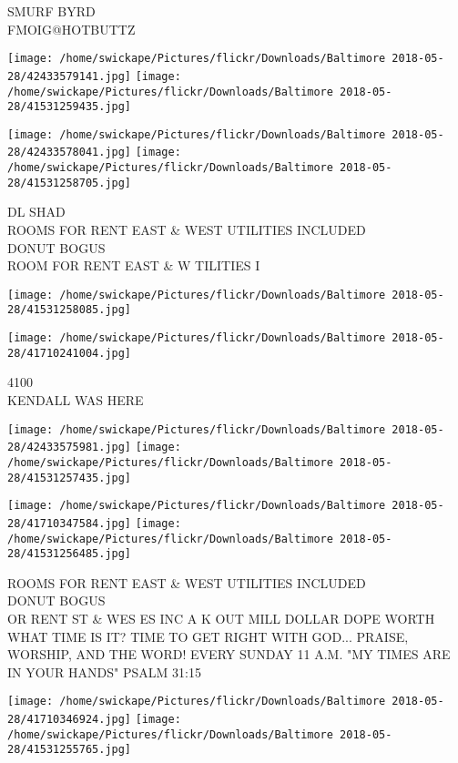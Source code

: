\documentclass[10pt,letterpaper]{article}
\begin{document}
SMURF BYRD\\
FMOIG@HOTBUTTZ
\pagebreak

\texttt{[image: /home/swickape/Pictures/flickr/Downloads/Baltimore 2018-05-28/42433579141.jpg]}
\texttt{[image: /home/swickape/Pictures/flickr/Downloads/Baltimore 2018-05-28/41531259435.jpg]}

\texttt{[image: /home/swickape/Pictures/flickr/Downloads/Baltimore 2018-05-28/42433578041.jpg]}
\texttt{[image: /home/swickape/Pictures/flickr/Downloads/Baltimore 2018-05-28/41531258705.jpg]}

DL SHAD\\
ROOMS FOR RENT EAST \& WEST UTILITIES INCLUDED\\
DONUT BOGUS\\
ROOM FOR RENT EAST \& W TILITIES I
\pagebreak

\texttt{[image: /home/swickape/Pictures/flickr/Downloads/Baltimore 2018-05-28/41531258085.jpg]}

\vspace{0.25in}
\texttt{[image: /home/swickape/Pictures/flickr/Downloads/Baltimore 2018-05-28/41710241004.jpg]}

4100\\
KENDALL WAS HERE
\pagebreak

\texttt{[image: /home/swickape/Pictures/flickr/Downloads/Baltimore 2018-05-28/42433575981.jpg]}
\texttt{[image: /home/swickape/Pictures/flickr/Downloads/Baltimore 2018-05-28/41531257435.jpg]}

\texttt{[image: /home/swickape/Pictures/flickr/Downloads/Baltimore 2018-05-28/41710347584.jpg]}
\texttt{[image: /home/swickape/Pictures/flickr/Downloads/Baltimore 2018-05-28/41531256485.jpg]}

ROOMS FOR RENT EAST \& WEST UTILITIES INCLUDED\\
DONUT BOGUS\\
OR RENT ST \& WES ES INC A K OUT MILL DOLLAR DOPE WORTH\\
WHAT TIME IS IT?  TIME TO GET RIGHT WITH GOD... PRAISE, WORSHIP, AND THE WORD!  EVERY SUNDAY 11 A.M.  "MY TIMES ARE IN YOUR HANDS" PSALM 31:15
\pagebreak

\texttt{[image: /home/swickape/Pictures/flickr/Downloads/Baltimore 2018-05-28/41710346924.jpg]}
\texttt{[image: /home/swickape/Pictures/flickr/Downloads/Baltimore 2018-05-28/41531255765.jpg]}
\end{document}
